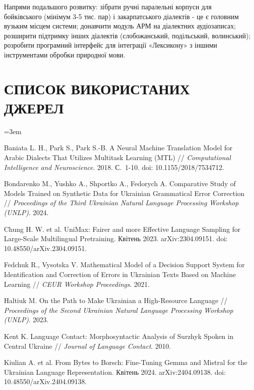\documentclass[14pt]{extarticle}
\newcommand{\referencesloppy}{%
  \tolerance=1000
  \emergencystretch=3em
  \hbadness=10000
}
\let\oldaddcontentsline\addcontentsline
\renewcommand{\addcontentsline}[3]{\phantomsection\oldaddcontentsline{#1}{#2}{#3}}
\begin{document}
Напрями подальшого розвитку: зібрати ручні паралельні корпуси для бойківського (мінімум 3-5 тис. пар) і закарпатського діалектів - це є головним вузьким місцем системи; донавчити модуль АРМ на діалектних аудіозаписах; розширити підтримку інших діалектів (слобожанський, подільський, волинський); розробити програмний інтерфейс для інтеграції «Лексикону» з іншими інструментами обробки природної мови.

\clearpage

\section*{СПИСОК ВИКОРИСТАНИХ ДЖЕРЕЛ}

\referencesloppy
\begin{reflist}
  \item \label{ref:baniata2018} Baniata L. H., Park S., Park S.-B. A Neural Machine Translation Model for Arabic Dialects That Utilizes Multitask Learning (MTL) // \textit{Computational Intelligence and Neuroscience}. 2018. С.~1-10. doi: 10.1155/2018/7534712.
  \item \label{ref:bondarenko4} Bondarenko M., Yushko A., Shportko A., Fedorych A. Comparative Study of Models Trained on Synthetic Data for Ukrainian Grammatical Error Correction // \textit{Proceedings of the Third Ukrainian Natural Language Processing Workshop (UNLP)}. 2024.
  \item \label{ref:unimax} Chung H. W. et al. UniMax: Fairer and more Effective Language Sampling for Large-Scale Multilingual Pretraining. Квітень 2023. arXiv:2304.09151. doi: 10.48550/arXiv.2304.09151.
  \item \label{ref:fedchukVysotska} Fedchuk R., Vysotska V. Mathematical Model of a Decision Support System for Identification and Correction of Errors in Ukrainian Texts Based on Machine Learning // \textit{CEUR Workshop Proceedings}. 2021.
  \item \label{ref:haltiuk} Haltiuk M. On the Path to Make Ukrainian a High-Resource Language // \textit{Proceedings of the Second Ukrainian Natural Language Processing Workshop (UNLP)}. 2023.
  \item \label{ref:kentSurzhyk} Kent K. Language Contact: Morphosyntactic Analysis of Surzhyk Spoken in Central Ukraine // \textit{Journal of Language Contact}. 2010.
  \item \label{ref:kiulian2024} Kiulian A. et al. From Bytes to Borsch: Fine-Tuning Gemma and Mistral for the Ukrainian Language Representation. Квітень 2024. arXiv:2404.09138. doi: 10.48550/arXiv.2404.09138.

\end{reflist}
\end{document}
